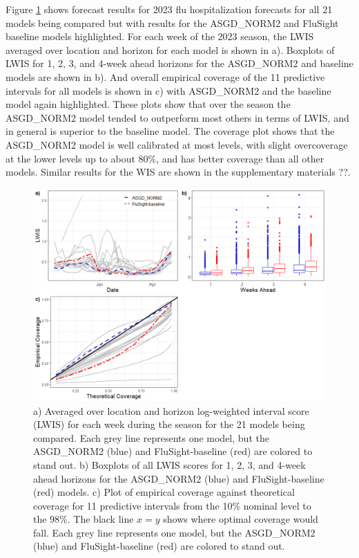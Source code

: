 Figure \ref{fig:lwis_cover_sum} shows forecast results for 2023 flu 
hospitalization forecasts for all 21 models being compared but with results
for the ASGD\_NORM2 and FluSight baseline models highlighted. 
For each week of the 2023 season, the  
LWIS averaged over location and horizon 
for each model is shown in a). Boxplots of LWIS for 1, 2, 3, and 4-week ahead
horizons for the ASGD\_NORM2 and baseline models are shown in b). And 
overall empirical coverage of the 11 predictive intervals for all models is 
shown in c) with ASGD\_NORM2 and the baseline model again highlighted. 
These plots show that over the season the ASGD\_NORM2 model tended to 
outperform most others in terms of LWIS, and in general is superior to the 
baseline model. The coverage plot shows that the ASGD\_NORM2 model is well 
calibrated at most levels, with slight overcoverage at the lower levels
up to about 80\%, and has better coverage than all other models. Similar results
for the WIS are shown in the supplementary materials ??.






\begin{figure}[hbt!]
    
    \begin{adjustwidth}{-1.2cm}{-1.5cm}
    \includegraphics[scale = .54]{Images/lwis_cover_sum.png}
    \caption{a) Averaged over location and horizon log-weighted interval score
    (LWIS) for each week during the season for the 21 models being compared. 
    Each grey line represents one model, but the ASGD\_NORM2 (blue) and 
    FluSight-baseline (red) are colored to stand out.
    b) Boxplots of all LWIS scores for 1, 2, 3, and 4-week ahead horizons 
    for the ASGD\_NORM2 (blue) and FluSight-baseline (red) models.
    c) Plot of empirical coverage against theoretical coverage for 11 
    predictive intervals from the 10\% nominal level to the 98\%. The black
    line $x = y$ shows where optimal coverage would fall.
    Each grey line represents one model, but the ASGD\_NORM2 (blue) and 
    FluSight-baseline (red) are colored to stand out.}
    \end{adjustwidth}
    \label{fig:lwis_cover_sum}
\end{figure}

